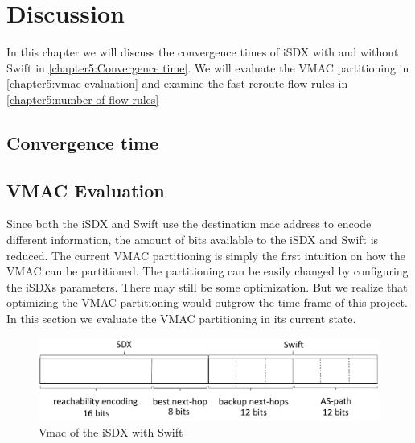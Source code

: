 \chapter{\label{chapter5}Discussion}

In this chapter we will discuss the convergence times of iSDX with and without Swift in \ref{chapter5:Convergence time}. We will evaluate the VMAC partitioning in \ref{chapter5:vmac evaluation} and examine the fast reroute flow rules in \ref{chapter5:number of flow rules}

\section{\label{chapter5:Convergence time}Convergence time}


\section{\label{chapter5:vmac evaluation}VMAC Evaluation}

Since both the iSDX and Swift use the destination mac address to encode different information, the amount of bits available to  the iSDX and Swift is reduced. The current VMAC partitioning is simply the first intuition on how the VMAC can be partitioned. The partitioning can be easily changed by configuring the iSDXs parameters. There may still be some optimization. But we realize that optimizing the VMAC partitioning would outgrow the time frame of this project. In this section we evaluate the VMAC partitioning in its current state.

\begin{figure}[h]
\center
\includegraphics[scale = 0.65]{Figures/eval_vmac_cropped2.pdf}
\caption{Vmac of the iSDX with Swift}
\end{figure}


